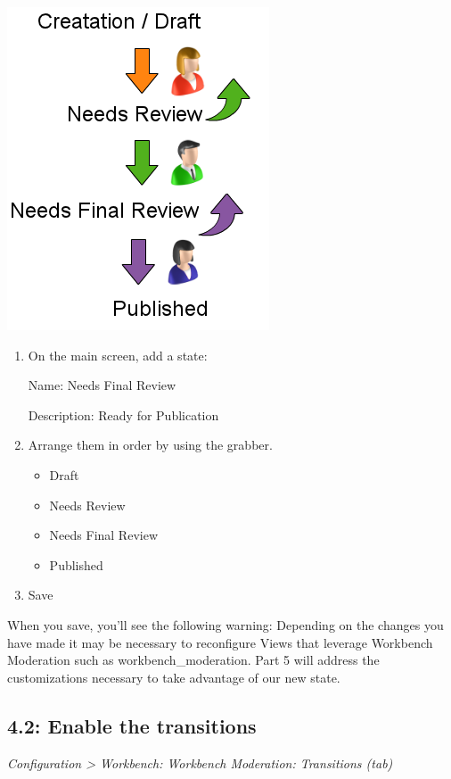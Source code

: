 \documentclass[letterpaper,10pt,english]{sphinxmanual}
\begin{document}
{\includegraphics{workflow.png}\hfill}
\begin{enumerate}
\item {} 
On the main screen, add a state:

Name: Needs Final Review

Description: Ready for Publication

\item {} 
Arrange them in order by using the grabber.
\begin{itemize}
\item {} 
Draft

\item {} 
Needs Review

\item {} 
Needs Final Review

\item {} 
Published

\end{itemize}

\item {} 
Save

\end{enumerate}

When you save, you'll see the following warning: Depending on the changes you have made it may be necessary to reconfigure Views that leverage Workbench Moderation such as workbench\_moderation. Part 5 will address the customizations necessary to take advantage of our new state.


\subsection{4.2: Enable the transitions}
\label{workbench:enable-the-transitions}
\emph{Configuration \textgreater{} Workbench: Workbench Moderation: Transitions (tab)}
\end{document}
